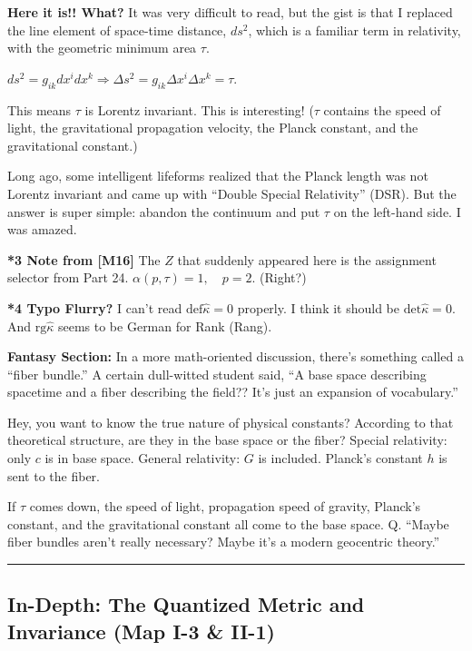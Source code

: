 \documentclass[11pt,a4paper,oneside]{article}
\newcommand{\hr}{\par\vspace{2em}\noindent\rule{\linewidth}{0.4pt}\par\vspace{2em}}
\begin{document}
\begin{reflectionbox}[title={Chat / Notes}]
    \textbf{Here it is!! What?}
    It was very difficult to read, but the gist is that I replaced the line element of space-time distance, $ds^2$, which is a familiar term in relativity, with the geometric minimum area $\tau$.
    
    $ds^2 = g_{ik} dx^idx^k \Rightarrow \Delta s^2 = g_{ik} \Delta x^i \Delta x^k = \tau$.
    
    This means $\tau$ is Lorentz invariant. This is interesting! ($\tau$ contains the speed of light, the gravitational propagation velocity, the Planck constant, and the gravitational constant.)
    
    Long ago, some intelligent lifeforms realized that the Planck length was not Lorentz invariant and came up with ``Double Special Relativity'' (DSR). But the answer is super simple: abandon the continuum and put $\tau$ on the left-hand side. I was amazed.
    
    \textbf{*3 Note from [M16]}
    The $Z$ that suddenly appeared here is the assignment selector from Part 24.
    $\alpha(p,\tau)= 1,\quad p=2$. (Right?)
    
    \textbf{*4 Typo Flurry?}
    I can't read $\mathrm{def} \hat {\kappa} = 0$ properly. I think it should be $\mathrm{det} \hat {\kappa} = 0$. And $\mathrm{rg} \hat {\kappa}$ seems to be German for Rank (Rang).
    
    \textbf{Fantasy Section:}
    In a more math-oriented discussion, there's something called a ``fiber bundle.'' A certain dull-witted student said, ``A base space describing spacetime and a fiber describing the field?? It's just an expansion of vocabulary.''
    
    Hey, you want to know the true nature of physical constants? According to that theoretical structure, are they in the base space or the fiber?
    Special relativity: only $c$ is in base space.
    General relativity: $G$ is included. Planck's constant $h$ is sent to the fiber.
    
    If $\tau$ comes down, the speed of light, propagation speed of gravity, Planck's constant, and the gravitational constant all come to the base space.
    Q. ``Maybe fiber bundles aren't really necessary? Maybe it's a modern geocentric theory.''
\end{reflectionbox}

\hr

\subsection*{In-Depth: The Quantized Metric and Invariance (Map I-3 \& II-1)}
\end{document}
